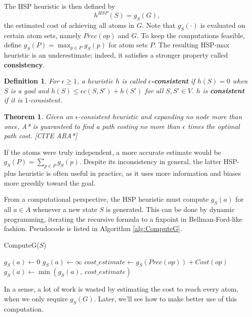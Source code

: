 \documentclass[letterpaper]{article}
\newtheorem{thm}{Theorem}
\newtheorem{defn}{Definition}
\begin{document}
The HSP heuristic is then defined by
\[h^{HSP}(S) = g_S(G),\]
the estimated cost of achieving all atoms in $G$. Note that $g_S(\cdot)$ is evaluated on certain atom sets, namely $Prec(op)$ and $G$.
To keep the computations feasible, define $g_S(P) = \max_{p\in P} g_S(p)$ for atom sets $P$.
The resulting HSP-max heuristic is an underestimate; indeed, it satisfies a stronger property called \textbf{consistency}.

\begin{defn} For $\epsilon\ge 1$, a heuristic $h$ is called \textbf{$\epsilon$-consistent} if $h(S) = 0$ when $S$ is a goal and $h(S) \le \epsilon c(S,S') + h(S')$ for all $S,S'\in V$. $h$ is \textbf{consistent} if it is $1$-consistent. \end{defn}
\begin{thm} Given an $\epsilon$-consistent heuristic and expanding no node more than once, A* is guaranteed to find a path costing no more than $\epsilon$ times the optimal path cost. [CITE ARA*] \end{thm}

If the atoms were truly independent, a more accurate estimate would be $g_S(P) = \sum_{p\in P} g_S(p)$.
Despite its inconsistency in general, the latter HSP-plus heuristic is often useful in practice, as it uses more information and biases more greedily toward the goal.

From a computational perspective, the HSP heuristic must compute $g_S(a)$ for all $a\in A$ whenever a new state $S$ is generated.
This can be done by dynamic programming, iterating the recursive formula to a fixpoint in Bellman-Ford-like fashion.
Pseudocode is listed in Algorithm \ref{alg:ComputeG}.

\begin{algorithm}
\caption{ComputeG($S$)}
\label{alg:ComputeG}
\begin{algorithmic}
\STATE $g_S(a) \leftarrow 0$
\ELSE
\STATE $g_S(a) \leftarrow \infty$
\ENDIF
\ENDFOR
\REPEAT
{}
\STATE $cost\_estimate \leftarrow g_S(Prec(op)) + Cost(op)$
\STATE $g_S(a) \leftarrow \min \left(g_S(a),~cost\_estimate\right)$
\ENDFOR
\ENDFOR
{}
\end{algorithmic}
\end{algorithm}

In a sense, a lot of work is wasted by estimating the cost to reach every atom, when we only require $g_S(G)$.
Later, we'll see how to make better use of this computation.
\end{document}
